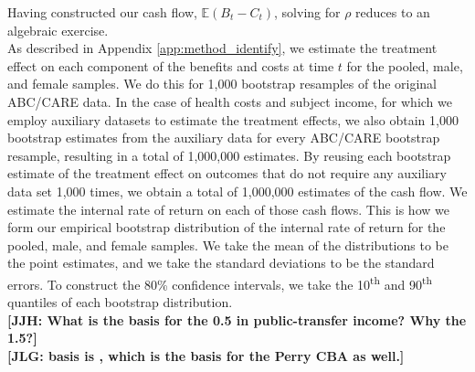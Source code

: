 \noindent Having constructed our cash flow, $\mathbb{E} (B_t - C_t)$, solving for $\rho$
reduces to an algebraic exercise. \\

\noindent As described in Appendix \ref{app:method_identify}, we estimate the treatment effect on each
component of the benefits and costs at time $t$ for the pooled, male, and
female samples. We do this for 1,000 bootstrap resamples of the original ABC/CARE data.
In the case of health costs and subject income, for which we employ auxiliary datasets to
estimate the treatment effects, we also obtain 1,000 bootstrap estimates from the auxiliary data
for every ABC/CARE bootstrap resample, resulting in a total of 1,000,000 estimates.
By reusing each bootstrap estimate of the treatment effect on outcomes that do not require any auxiliary data
set 1,000 times, we obtain a total of 1,000,000 estimates of the cash flow.
We estimate the internal rate of return on each of those cash flows.
This is how we form our empirical bootstrap distribution of the internal rate of return for the pooled, male, and female samples.
We take the mean of the distributions to be the point estimates, and we take the standard deviations
to be the standard errors. To construct the 80\% confidence intervals, we take the 10\textsuperscript{th}
and 90\textsuperscript{th} quantiles of each bootstrap distribution. \\

\noindent \textbf{[JJH: What is the basis for the 0.5 in public-transfer income? Why the 1.5?]} \\
\noindent \textbf{[JLG: basis is \citet{Browning_1987_AER,Heckman_Smith_1998_evaluating,Heckman_LaLonde_etal_1999_active,Feldstein_1999_REStat}, which is the basis for the Perry CBA as well.]}




